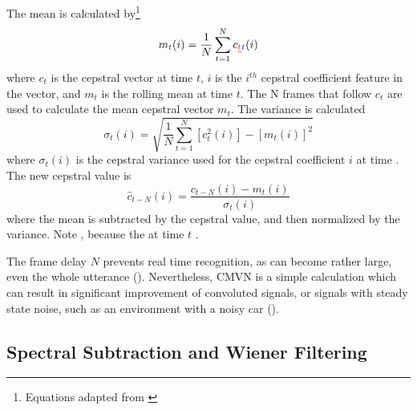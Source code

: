 The mean is calculated by\footnote{Equations adapted from \cite{viikki:98}} \begin{equation} m_t(i) = \dfrac{1}{N}\sum_{t=1}^{N} c\DIFdelbegin \DIFdel{_t}\DIFdelend \DIFaddbegin \DIFadd{_{t}}\DIFaddend (i) \end{equation} where $c_t$ is the cepstral vector at time $t$, $i$ is the $i^{th}$ cepstral coefficient feature in the vector, and $m_t$ is the rolling mean at time $t$.  The N frames that follow $c_t$ are used to calculate the mean cepstral vector $m_t$.  The variance is calculated \DIFaddbegin {}\DIFaddend \begin{equation} \sigma_t(i) = \sqrt{\dfrac{1}{N}\sum_{t=1}^{N} [c_t^2(i)] - [m_t(i)]^2} \end{equation} where $\sigma_t(i)$ is the cepstral variance used for the cepstral coefficient $i$ at time \DIFdelbegin {}\DIFdelend \DIFaddbegin {}\DIFaddend .  The new cepstral value is \begin{equation} \hat{c}_{t-N}(i) =  \dfrac{c_{t-N}(i) - m_t(i)}{\sigma_{t}(i)} \end{equation} where the mean is subtracted by the cepstral value, and then normalized by the variance.  Note \DIFdelbegin {}\DIFdelend \DIFaddbegin {}\DIFaddend , because the \DIFdelbegin {}\DIFdelend \DIFaddbegin {}\DIFaddend at time $t$ \DIFdelbegin {}\DIFdelend \DIFaddbegin {}\DIFaddend .

The frame delay $N$ prevents real time recognition, as \DIFdelbegin {}\DIFdelend \DIFaddbegin {}\DIFaddend can become rather large, even \DIFdelbegin {}\DIFdelend \DIFaddbegin {}\DIFaddend the whole utterance (\cite{li:14}).  Nevertheless, CMVN is a simple calculation which can result in significant improvement of convoluted signals, or signals with steady state noise, such as an environment with a noisy car (\cite{viikki:98}).

\DIFdelbegin \subsubsection{}%
\addtocounter{subsubsection}{-1}%
\DIFdelend \DIFaddbegin \subsection{Spectral Subtraction and Wiener Filtering}\DIFaddend \label{sec:spec-sub_wiener}

